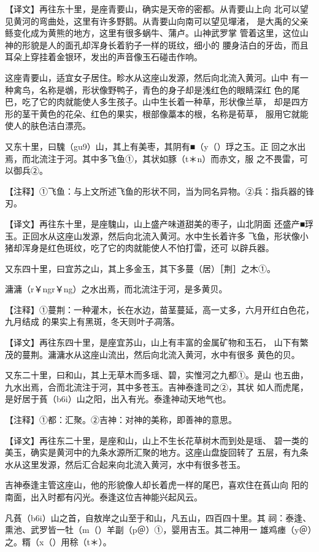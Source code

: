 \documentclass[a4paper,12pt,UTF8,twoside]{ctexbook}
\begin{document}
【译文】再往东十里，是座青要山，确实是天帝的密都。从青要山上向 北可以望见黄河的弯曲处，这里有许多野鹅。从青要山向南可以望见墠渚， 是大禹的父亲鲧变化成为黄熊的地方，这里有很多蜗牛、蒲卢。山神武罗掌 管着这里，这位山神的形貌是人的面孔却浑身长着豹子一样的斑纹，细小的 腰身洁白的牙齿，而且耳朵上穿挂着金银环，发出的声音像玉石碰击作响。

这座青要山，适宜女子居住。畛水从这座山发源，然后向北流入黄河。山中 有一种禽鸟，名称是鴢，形状像野鸭子，青色的身子却是浅红色的眼睛深红 色的尾巴，吃了它的肉就能使人多生孩子。山中生长着一种草，形状像兰草， 却是四方形的茎干黄色的花朵、红色的果实，根部像藁本的根，名称是荀草， 服用它就能使人的肤色洁白漂亮。

又东十里，曰騩（gu9）山，其上有美枣，其阴有■（y（）琈之玉。正 回之水出焉，而北流注于河。其中多飞鱼①，其状如豚（t＊n）而赤文，服 之不畏雷，可以御兵②。

【注释】①飞鱼：与上文所述飞鱼的形状不同，当为同名异物。②兵：指兵器的锋刃。

【译文】再往东十里，是座騩山，山上盛产味道甜美的枣子，山北阴面 还盛产■琈玉。正回水从这座山发源，然后向北流入黄河。水中生长着许多 飞鱼，形状像小猪却浑身是红色斑纹，吃了它的肉就能使人不怕打雷，还可 以辟兵器。

又东四十里，曰宜苏之山，其上多金玉，其下多蔓（居）［荆］之木①。

滽滽（r￥ngr￥ng）之水出焉，而北流注于河，是多黄贝。

【注释】①蔓荆：一种灌木，长在水边，苗茎蔓延，高一丈多，六月开红白色花，九月结成 的果实上有黑斑，冬天则叶子凋落。

【译文】再往东四十里，是座宜苏山，山上有丰富的金属矿物和玉石， 山下有繁茂的蔓荆。滽滽水从这座山流出，然后向北流入黄河，水中有很多 黄色的贝。

又东二十里，曰和山，其上无草木而多瑶、碧，实惟河之九都①。是山 也五曲，九水出焉，合而北流注于河，其中多苍玉。吉神泰逢司之②，其状 如人而虎尾，是好居于萯（b6i）山之阳，出入有光。泰逢神动天地气也。

【注释】①都：汇聚。②吉神：对神的美称，即善神的意思。

【译文】再往东二十里，是座和山，山上不生长花草树木而到处是瑶、 碧一类的美玉，确实是黄河中的九条水源所汇聚的地方。这座山盘旋回转了 五层，有九条水从这里发源，然后汇合起来向北流入黄河，水中有很多苍玉。

吉神泰逢主管这座山，他的形貌像人却长着虎一样的尾巴，喜欢住在萯山向 阳的南面，出入时都有闪光。泰逢这位吉神能兴起风云。

凡萯（b6i）山之首，自敖岸之山至于和山，凡五山，四百四十里。其 祠：泰逢、熏池、武罗皆一牡（m（）羊副（p＠）①，婴用吉玉。其二神用一 雄鸡瘗（y＠）之。糈（x（）用稌（t＊）。
\end{document}
